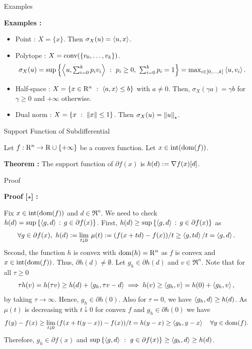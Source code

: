 \documentclass[9pt]{beamer}
\begin{document}
\begin{frame}{Examples}

  \textbf{Examples :}
  \begin{itemize}
    \setlength{\itemsep}{1em}
  \item Point : $X=\{x\}$. Then $\sigma_X(u) = \left<u, x\right>$.
  \item Polytope : $X=\operatorname{conv}(\{v_0, \dots, v_k\})$.
    \[
      \sigma_X(u) = \sup \left\{ \left<u, \textstyle\sum_{i=0}^k p_i v_i\right>\ : \ p_i\geq 0, ~\textstyle\sum_{i=0}^k p_i=1 \right\} =\textstyle \max_{i\in[0,\dots, k]} \left<u, v_i\right>.
    \]
  \item Half-space : $X= \left\{ x\in \mathrm{R}^n\ : \ \left<a, x\right>\leq b \right\}$ with $a\neq 0$. Then, $\sigma_X(\gamma a) = \gamma b$ for $\gamma \geq 0$ and $+\infty$ otherwise.
  \item Dual norm : $X=\left\{ x\ : \ \left\|x\right\|\leq 1 \right\}$. Then $\sigma_X(u)=\left\|u\right\|_\star$.
  \end{itemize}

  
\end{frame}

\begin{frame}{Support Function of Subdifferential}

  Let $f:\mathrm{R}^n\to\mathrm{R}\cup\{+\infty\}$ be a convex function. Let $x\in\operatorname{int}(\operatorname{dom}(f))$.

  \vfill

  \textbf{Theorem : } The support function of $\partial f(x)$ is $h(d):= \nabla f(x)[d]$.

  
\end{frame}

\begin{frame}{Proof}

  \textbf{Proof [$\star$] :}

  Fix $x\in \operatorname{int}(\operatorname{dom}(f))$ and $d\in \Re^n$. We need to check $h(d) = \sup \left\{ \left<g, d\right>\!\ : \ \!g \in \partial f(x) \right\}$. First, $h(d) \geq \sup \left\{ \left<g, d\right>\!\ : \ \!g \in \partial f(x) \right\}$ as
  \[
    \forall g \in \partial f(x), ~ h(d):= \lim_{t\downarrow 0} \, \mu(t):= (f(x+t d) - f(x))/t \geq \left<g, td\right>/t = \left<g, d\right>.
  \]
  Second, the function $h$ is convex with $\operatorname{dom}(h)=\mathrm{R}^n$ as $f$ is convex and $x\in\operatorname{int}(\operatorname{dom}(f))$. Thus, $\partial h(d) \neq \emptyset$. Let $g_h\in \partial h(d)$ and $v\in\Re^n$. Note that for all $\tau \geq 0$
  \[
    \tau h(v) = h(\tau v) \geq h(d) + \left<g_h, \tau v - d\right> \implies h(v)\geq \left<g_h, v\right> = h(0) + \left<g_h, v\right>,
  \]
  by taking $\tau\to\infty$. Hence, $g_h \in \partial h(0)$. Also for $\tau=0$, we have $\left<g_h, d\right>\geq h(d)$. As $\mu(t)$ is decreasing with $t\downarrow 0$ for convex $f$ and $g_h \in \partial h(0)$ we have
  \[
    f(y) - f(x) \geq \lim_{t\downarrow 0} \, (f(x + t(y-x))-f(x))/t =  h(y-x) \geq \left<g_h, y-x\right> \quad \forall y \in \operatorname{dom}(f).
  \]
  Therefore, $g_h\in \partial f(x)$ and $\sup\left\{ \left<g, d\right>\ : \ g\in\partial f(x) \right\} \geq \left<g_h, d\right> \geq h(d)$.
  
\end{frame}
\end{document}
